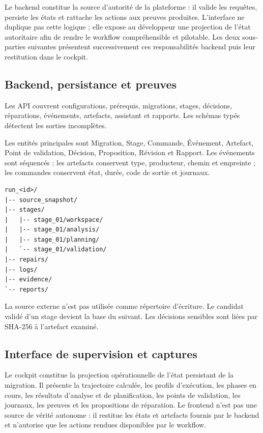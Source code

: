 Le backend constitue la source d'autorité de la plateforme : il valide les requêtes, persiste les états et rattache les actions aux preuves produites. L'interface ne duplique pas cette logique ; elle expose au développeur une projection de l'état autoritaire afin de rendre le workflow compréhensible et pilotable. Les deux sous-parties suivantes présentent successivement ces responsabilités backend puis leur restitution dans le cockpit.

\subsection{Backend, persistance et preuves}

Les API couvrent configurations, prérequis, migrations, stages, décisions, réparations, événements, artefacts, assistant et rapports. Les schémas typés détectent les sorties incomplètes.

Les entités principales sont Migration, Stage, Commande, Événement, Artefact, Point de validation, Décision, Proposition, Révision et Rapport. Les événements sont séquencés ; les artefacts conservent type, producteur, chemin et empreinte ; les commandes conservent état, durée, code de sortie et journaux.

\begin{verbatim}
run_<id>/
|-- source_snapshot/
|-- stages/
|   |-- stage_01/workspace/
|   |-- stage_01/analysis/
|   |-- stage_01/planning/
|   `-- stage_01/validation/
|-- repairs/
|-- logs/
|-- evidence/
`-- reports/
\end{verbatim}

La source externe n'est pas utilisée comme répertoire d'écriture. Le candidat validé d'un stage devient la base du suivant. Les décisions sensibles sont liées par SHA-256 à l'artefact examiné.

\subsection{Interface de supervision et captures}

Le cockpit constitue la projection opérationnelle de l'état persistant de la migration. Il présente la trajectoire calculée, les profils d'exécution, les phases en cours, les résultats d'analyse et de planification, les points de validation, les journaux, les preuves et les propositions de réparation. Le frontend n'est pas une source de vérité autonome : il restitue les états et artefacts fournis par le backend et n'autorise que les actions rendues disponibles par le workflow.

